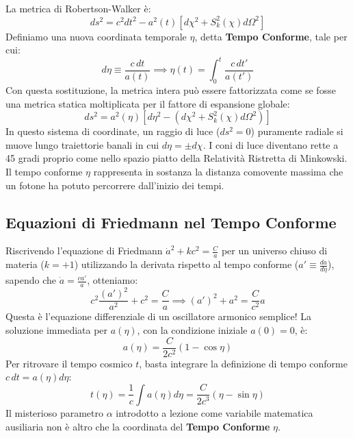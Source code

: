 \documentclass[11pt,a4paper]{report}
\begin{document}
La metrica di Robertson-Walker è:
\begin{equation}
ds^2 = c^2 dt^2 - a^2(t) \left[ d\chi^2 + S_k^2(\chi)d\Omega^2 \right]
\end{equation}
Definiamo una nuova coordinata temporale $\eta$, detta \textbf{Tempo Conforme}, tale per cui:
\begin{equation}
d\eta \equiv \frac{c \, dt}{a(t)} \implies \eta(t) = \int_0^t \frac{c \, dt'}{a(t')}
\end{equation}
Con questa sostituzione, la metrica intera può essere fattorizzata come se fosse una metrica statica moltiplicata per il fattore di espansione globale:
\begin{equation}
ds^2 = a^2(\eta) \left[ d\eta^2 - \left( d\chi^2 + S_k^2(\chi)d\Omega^2 \right) \right]
\end{equation}
In questo sistema di coordinate, un raggio di luce ($ds^2 = 0$) puramente radiale si muove lungo traiettorie banali in cui $d\eta = \pm d\chi$. I coni di luce diventano rette a 45 gradi proprio come nello spazio piatto della Relatività Ristretta di Minkowski. Il tempo conforme $\eta$ rappresenta in sostanza la distanza comovente massima che un fotone ha potuto percorrere dall'inizio dei tempi.

\subsection{Equazioni di Friedmann nel Tempo Conforme}
Riscrivendo l'equazione di Friedmann $\dot{a}^2 + kc^2 = \frac{C}{a}$ per un universo chiuso di materia ($k=+1$) utilizzando la derivata rispetto al tempo conforme ($a' \equiv \frac{da}{d\eta}$), sapendo che $\dot{a} = \frac{ca'}{a}$, otteniamo:
\begin{equation}
c^2 \frac{(a')^2}{a^2} + c^2 = \frac{C}{a} \implies (a')^2 + a^2 = \frac{C}{c^2} a
\end{equation}
Questa è l'equazione differenziale di un oscillatore armonico semplice! La soluzione immediata per $a(\eta)$, con la condizione iniziale $a(0)=0$, è:
\begin{equation}
a(\eta) = \frac{C}{2c^2} (1 - \cos\eta)
\end{equation}
Per ritrovare il tempo cosmico $t$, basta integrare la definizione di tempo conforme $c \, dt = a(\eta) d\eta$:
\begin{equation}
t(\eta) = \frac{1}{c}\int a(\eta) d\eta = \frac{C}{2c^3} (\eta - \sin\eta)
\end{equation}
Il misterioso parametro $\alpha$ introdotto a lezione come variabile matematica ausiliaria non è altro che la coordinata del \textbf{Tempo Conforme} $\eta$.
\end{document}
